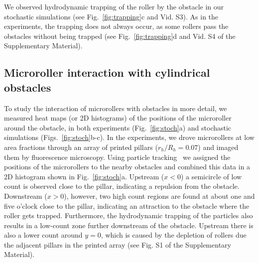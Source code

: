 \documentclass[12pt]{article}
\begin{document}
We observed hydrodynamic trapping of the roller by the obstacle in our stochastic simulations (see Fig.~\ref{fig:trapping}c and Vid. S3). As in the experiments, the trapping does not always occur, as some rollers pass the obstacles without being trapped (see Fig.~\ref{fig:trapping}d and Vid. S4 of the Supplementary Material).


\subsection*{Microroller interaction with cylindrical obstacles}

To study the interaction of microrollers with obstacles in more detail, we measured heat maps (or 2D histograms) of the positions of the microroller around the obstacle, in both experiments (Fig.~\ref{fig:stoch}a) and stochastic simulations (Figs.~\ref{fig:stoch}b-c). In the experiments, we drove microrollers at low area fractions through an array of printed pillars ($r_h/R_h=0.07$) and imaged them by fluorescence microscopy. Using particle tracking~\cite{crocker1996methods,allan2014trackpy} we assigned the positions of the microrollers to the nearby obstacles and combined this data in a 2D histogram shown in Fig.~\ref{fig:stoch}a. 
Upstream ($x < 0$) a semicircle of low count is observed close to the pillar, indicating a repulsion from the obstacle. Downstream ($x>0$), however, two high count regions are found at about one and five o'clock close to the pillar, indicating an attraction to the obstacle where the roller gets trapped. Furthermore, the hydrodynamic trapping of the particles also results in a low-count zone further downstream of the obstacle. Upstream there is also a lower count around $y=0$, which is caused by the depletion of rollers due the adjacent pillars in the printed array (see Fig. S1 of the Supplementary Material).  
\end{document}
